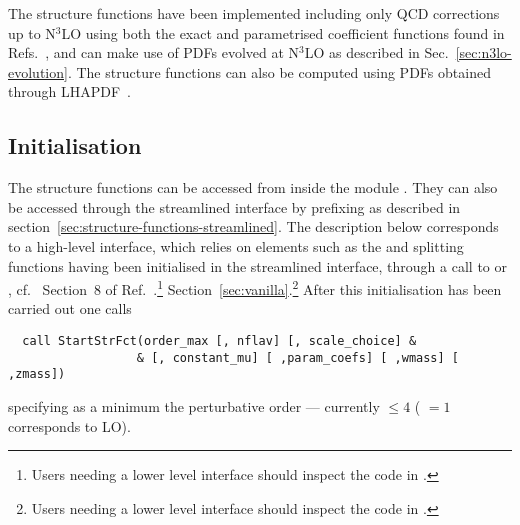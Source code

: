 The structure functions have been implemented including only QCD
corrections up to N$^3$LO using both the exact and parametrised
coefficient functions found in
Refs.~\cite{vanNeerven:1999ca,vanNeerven:2000uj,Moch:2004xu,Vermaseren:2005qc,Moch:2008fj,Davies:2016ruz,Blumlein:2022gpp},
and can make use of PDFs evolved at N$^3$LO as described in
Sec.~\ref{sec:n3lo-evolution}. The structure functions can also be
computed using PDFs obtained through LHAPDF~\cite{LHAPDF}.

\subsection{Initialisation}
\label{sec:structure-funcs-init}

The structure functions can be accessed from inside the module
. They can also be accessed through the
streamlined interface by prefixing  as described in
section~\ref{sec:structure-functions-streamlined}.
%
The description below corresponds to a high-level interface, which
relies on elements such as the  and splitting functions
having been initialised in the streamlined interface, through a call
to  or , cf.\
\ifreleasenote
Section~8 of Ref.~\cite{Salam:2008qg}.\footnote{Users needing a lower level
  interface should inspect the code in .}
\else
Section~\ref{sec:vanilla}.\footnote{Users needing a lower level
  interface should inspect the code in .}
\fi
%
After this initialisation has been carried out one calls
\begin{lstlisting}
  call StartStrFct(order_max [, nflav] [, scale_choice] &
                  & [, constant_mu] [ ,param_coefs] [ ,wmass] [ ,zmass])
\end{lstlisting}
specifying as a minimum the perturbative order --- currently
 $ \le 4$ (\ttt{order\_max} $ =1$ corresponds to LO).

